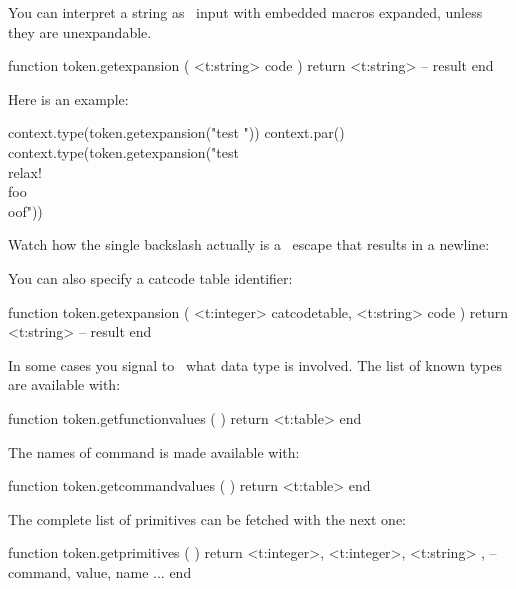 \startlines
\getbuffer
\stoplines

You can interpret a string as \TEX\ input with embedded macros expanded, unless
they are unexpandable.

\starttyping[option=LUA]
function token.getexpansion ( <t:string> code )
    return <t:string> -- result
end
\stoptyping

Here is an example:

\startbuffer
          \def\foo{foo}
\protected{}

\startluacode
context.type(token.getexpansion("test \relax"))
context.par()
context.type(token.getexpansion("test \\relax{!} \\foo\\oof"))
\stopluacode
\stopbuffer

\typebuffer

Watch how the single backslash actually is a \LUA\ escape that results in
a newline:

\startlines
\getbuffer
\stoplines

You can also specify a catcode table identifier:

\starttyping[option=LUA]
function token.getexpansion (
    <t:integer> catcodetable,
    <t:string>  code
)
    return <t:string> -- result
end
\stoptyping

\stopsubsection

\startsubsection[title={Information}]

In some cases you signal to \LUA\ what data type is involved. The list of known
types are available with:

\starttyping[option=LUA]
function token.getfunctionvalues ( )
    return <t:table>
end
\stoptyping

\startthreerows
{}
\stopthreerows

The names of command is made available with:

\starttyping[option=LUA]
function token.getcommandvalues ( )
    return <t:table>
end
\stoptyping

\starttworows
{}
\stoptworows

The complete list of primitives can be fetched with the next one:

\starttyping[option=LUA]
function token.getprimitives ( )
    return {
        { <t:integer>, <t:integer>, <t:string> }, -- command, value, name
        ...
    }
end
\stoptyping

